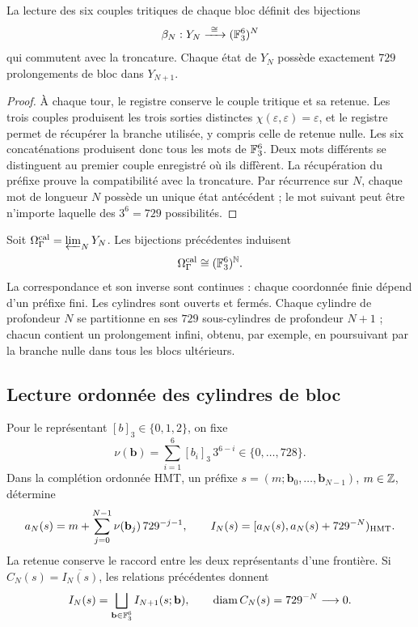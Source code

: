\begin{proposition}
\label{hmtfg:bloques-729}
La lecture des six couples tritiques de chaque bloc définit des bijections
\[
 \beta_N:Y_N\xrightarrow{\ \cong\ }(\FF_3^6)^N
\]
qui commutent avec la troncature. Chaque état de \(Y_N\) possède exactement \(729\) prolongements de bloc dans \(Y_{N+1}\).
\end{proposition}
\begin{proof}
À chaque tour, le registre conserve le couple tritique et sa retenue. Les trois couples produisent les trois sorties distinctes \(\chi(\varepsilon,\varepsilon)=\varepsilon\), et le registre permet de récupérer la branche utilisée, y compris celle de retenue nulle. Les six concaténations produisent donc tous les mots de \(\mathbb F_3^6\). Deux mots différents se distinguent au premier couple enregistré où ils diffèrent. La récupération du préfixe prouve la compatibilité avec la troncature. Par récurrence sur \(N\), chaque mot de longueur \(N\) possède un unique état antécédent ; le mot suivant peut être n’importe laquelle des \(3^6=729\) possibilités.
\end{proof}

Soit \(\Omega_{\Gamma}^{\rm cal}=\varprojlim_NY_N\). Les bijections précédentes induisent
\[
 \Omega_{\Gamma}^{\rm cal}\cong(\mathbb F_3^6)^{\mathbb N}.
\]
La correspondance et son inverse sont continues : chaque coordonnée finie dépend d’un préfixe fini. Les cylindres sont ouverts et fermés. Chaque cylindre de profondeur \(N\) se partitionne en ses \(729\) sous-cylindres de profondeur \(N+1\) ; chacun contient un prolongement infini, obtenu, par exemple, en poursuivant par la branche nulle dans tous les blocs ultérieurs.



\subsection{Lecture ordonnée des cylindres de bloc}
\label{hmtfg:publicacion-cilindros-bloque}

Pour le représentant \([b]_3\in\{0,1,2\}\), on fixe
\[
 \nu(\mathbf b)=\sum_{i=1}^6[b_i]_3\,3^{6-i}\in\{0,\ldots,728\}.
\]
Dans la complétion ordonnée HMT, un préfixe
\(s=(m;\mathbf b_0,\ldots,\mathbf b_{N-1})\), \(m\in\mathbb Z\), détermine
\[
 a_N(s)=m+\sum_{j=0}^{N-1}\nu(\mathbf b_j)\,729^{-j-1},\qquad
 I_N(s)=[a_N(s),a_N(s)+729^{-N})_{\rm HMT}.
\]
La retenue conserve le raccord entre les deux représentants d’une frontière. Si \(C_N(s)=\overline{I_N(s)}\), les relations précédentes donnent
\[
 I_N(s)=\bigsqcup_{\mathbf b\in\mathbb F_3^6}I_{N+1}(s;\mathbf b),
 \qquad \operatorname{diam}C_N(s)=729^{-N}\longrightarrow0.
\]

